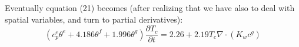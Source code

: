Eventually equation (21) becomes (after realizing that we have also to deal with spatial variables, and turn to partial derivatives):
\begin{equation}
(c_p^e \theta^e + 4.186 \theta^f + 1.996 \theta^g) \frac{\partial T_c}{\partial t} = 2.26 + 2.19 T_c \nabla \cdot ( K_w  c^g)
\end{equation}